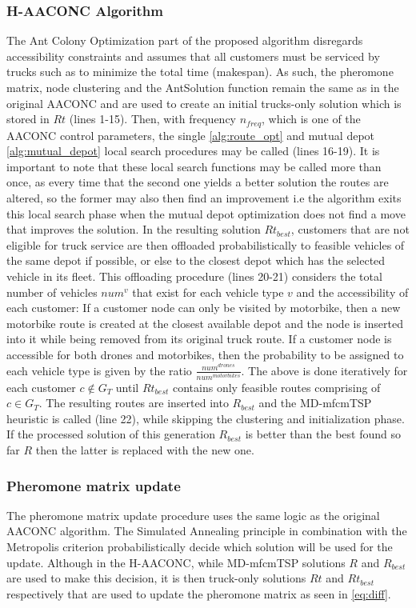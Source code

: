 \documentclass{article}
\begin{document}
	\subsubsection{H-AACONC Algorithm}
	The Ant Colony Optimization part of the proposed algorithm disregards accessibility constraints and assumes that all customers must be serviced by trucks such as to minimize the total time (makespan). As such, the pheromone matrix, node clustering and the AntSolution function remain the same as in the original AACONC and are used to create an initial trucks-only solution which is stored in $Rt$ (lines 1-15). Then, with frequency $n_{freq}$, which is one of the AACONC control parameters, the single \ref{alg:route_opt} and mutual depot \ref{alg:mutual_depot} local search procedures may be called (lines 16-19). It is important to note that these local search functions may be called more than once, as every time that the second one yields a better solution the routes are altered, so the former may also then find an improvement i.e the algorithm exits this local search phase when the mutual depot optimization does not find a move that improves the solution. In the resulting solution $Rt_{best}$, customers that are not eligible for truck service are then offloaded probabilistically to feasible vehicles of the same depot if possible, or else to the closest depot which has the selected vehicle in its fleet. This offloading procedure (lines 20-21) considers the total number of vehicles $num^{v}$ that exist for each vehicle type $v$ and the accessibility of each customer: If a customer node can only be visited by motorbike, then a new motorbike route is created at the closest available depot and the node is inserted into it while being removed from its original truck route. If a customer node is accessible for both drones and motorbikes, then the probability to be assigned to each vehicle type is given by the ratio $\frac{num^{drones}}{num^{motorbikes}}$. The above is done iteratively for each customer $c\notin G_T$ until $Rt_{best}$ contains only feasible routes comprising of $c\in G_T$.
	The resulting routes are inserted into $R_{best}$ and the MD-mfcmTSP heuristic is called (line 22), while skipping the clustering and initialization phase. If the processed solution of this generation $R_{best}$ is better than the best found so far $R$ then the latter is replaced with the new one.
	\;
	\subsubsection{Pheromone matrix update}
	The pheromone matrix update procedure uses the same logic as the original AACONC algorithm. The Simulated Annealing principle in combination with the Metropolis criterion probabilistically decide which solution will be used for the update. Although in the H-AACONC, while MD-mfcmTSP solutions $R$ and $R_{best}$ are used to make this decision, it is then truck-only solutions $Rt$ and $Rt_{best}$ respectively that are used to update the pheromone matrix as seen in \ref{eq:diff}.
	
\end{document}
